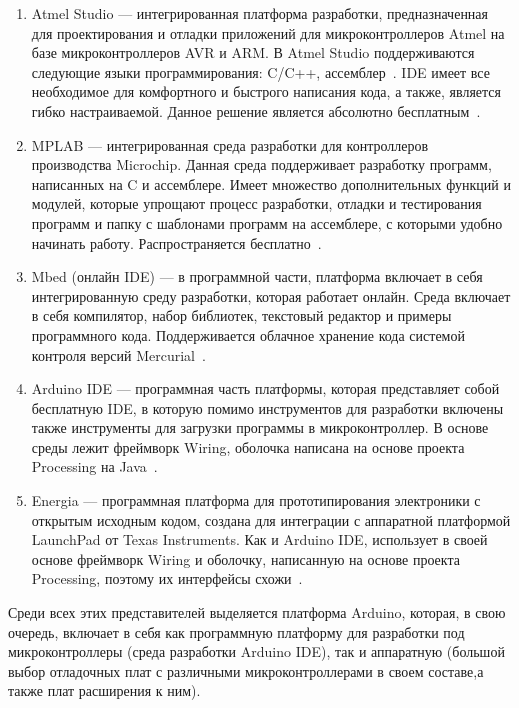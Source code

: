 \documentclass{altsu-report}
\begin{document}
\begin{enumerate}
    \item Atmel Studio --- интегрированная платформа разработки, предназначенная для проектирования и отладки приложений для микроконтроллеров Atmel на базе микроконтроллеров AVR и ARM. В Atmel Studio поддерживаются следующие языки программирования: C/C++, ассемблер~\cite{MK_2}. IDE имеет все необходимое для комфортного и быстрого написания кода, а также, является гибко настраиваемой. Данное решение является абсолютно бесплатным~\cite{Atmel}.
    
    \item MPLAB --- интегрированная среда разработки для контроллеров производства Microchip. Данная среда поддерживает разработку программ, написанных на C и ассемблере. Имеет множество дополнительных функций и модулей, которые упрощают процесс разработки, отладки и тестирования программ и папку с шаблонами программ на ассемблере, с которыми удобно начинать работу. Распространяется бесплатно~\cite{MPLAB}.
    
    \item Mbed (онлайн IDE) --- в программной части, платформа включает в себя интегрированную среду разработки, которая работает онлайн. Среда включает в себя компилятор, набор библиотек, текстовый редактор и примеры программного кода. Поддерживается облачное хранение кода системой контроля версий Mercurial~\cite{Mbed}.
    
    \item Arduino IDE --- программная часть платформы, которая представляет собой бесплатную IDE, в которую помимо инструментов для разработки включены также инструменты для загрузки программы в микроконтроллер. В основе среды лежит фреймворк Wiring, оболочка написана на основе проекта Processing на Java~\cite{wikiRUArduino}.
    
    \item Energia --- программная платформа для прототипирования электроники с открытым исходным кодом, создана для интеграции с аппаратной платформой LaunchPad от Texas Instruments. Как и Arduino IDE, использует в своей основе фреймворк Wiring и оболочку, написанную на основе проекта Processing, поэтому их интерфейсы схожи~\cite{Energia, ENERGIA}.
\end{enumerate}

Среди всех этих представителей выделяется платформа Arduino, которая, в свою очередь, включает в себя как программную платформу для разработки под микроконтроллеры (среда разработки Arduino IDE), так и аппаратную (большой выбор отладочных плат с различными микроконтроллерами в своем составе,а также плат расширения к ним).
\end{document}
